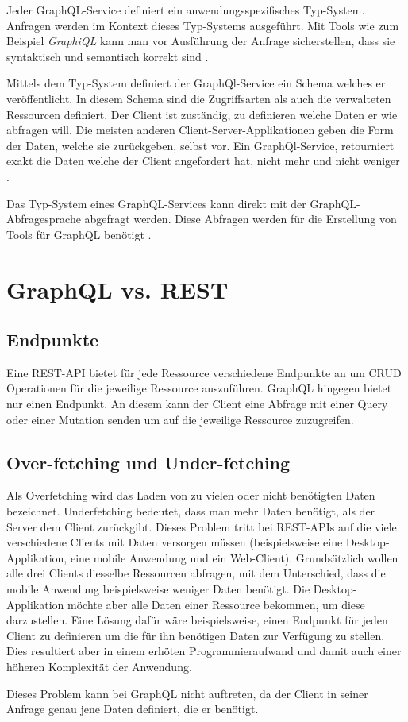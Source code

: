 Jeder GraphQL-Service definiert ein anwendungsspezifisches Typ-System.
Anfragen werden im Kontext dieses Typ-Systems ausgeführt.
Mit Tools wie zum Beispiel \textit{GraphiQL} kann man vor Ausführung der Anfrage sicherstellen, dass sie syntaktisch und semantisch korrekt sind \cite[Abs. 1]{graphqlOnline}.

Mittels dem Typ-System definiert der GraphQl-Service ein Schema welches er veröffentlicht.
In diesem Schema sind die Zugriffsarten als auch die verwalteten Ressourcen definiert.
Der Client ist zuständig, zu definieren welche Daten er wie abfragen will.
Die meisten anderen Client-Server-Applikationen geben die Form der Daten, welche sie zurückgeben, selbst vor.
Ein GraphQl-Service, retourniert exakt die Daten welche der Client angefordert hat, nicht mehr und nicht weniger \cite[Abs. 1]{graphqlOnline}.

Das Typ-System eines GraphQL-Services kann direkt mit der GraphQL-Abfragesprache abgefragt werden. Diese Abfragen werden für die Erstellung von Tools für GraphQL benötigt \cite[Abs. 1]{graphqlOnline}.

\section{GraphQL vs. REST}
\subsection{Endpunkte}
Eine REST-API bietet für jede Ressource verschiedene Endpunkte an um CRUD Operationen für die jeweilige Ressource auszuführen. GraphQL hingegen bietet nur einen
Endpunkt. An diesem kann der Client eine Abfrage mit einer Query oder einer Mutation senden um auf die jeweilige Ressource zuzugreifen.

\subsection{Over-fetching und Under-fetching}
Als Overfetching wird das Laden von zu vielen oder nicht benötigten Daten bezeichnet.
Underfetching bedeutet, dass man mehr Daten benötigt, als der Server dem Client zurückgibt.
Dieses Problem tritt bei REST-APIs auf die viele verschiedene Clients mit Daten versorgen müssen (beispielsweise eine Desktop-Applikation, eine mobile Anwendung und ein Web-Client).
Grundsätzlich wollen alle drei Clients diesselbe Ressourcen abfragen, mit dem Unterschied, dass die mobile Anwendung beispielsweise weniger Daten benötigt.
Die Desktop-Applikation möchte aber alle Daten einer Ressource bekommen, um diese darzustellen.
Eine Lösung dafür wäre beispielsweise, einen Endpunkt für jeden Client zu definieren um die für ihn benötigen Daten zur Verfügung zu stellen.
Dies resultiert aber in einem erhöten Programmieraufwand und damit auch einer höheren Komplexität der Anwendung.
\newline

Dieses Problem kann bei GraphQL nicht auftreten, da der Client in seiner Anfrage genau jene Daten definiert, die er benötigt.